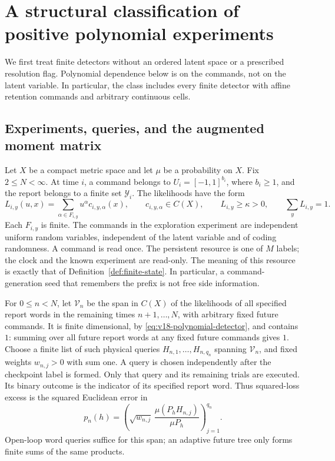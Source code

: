 \documentclass[11pt]{amsart}
\theoremstyle{definition}\newtheorem{definition}[theorem]{Definition}
\theoremstyle{remark}\newtheorem{remark}[theorem]{Remark}
\begin{document}
\section{A structural classification of positive polynomial experiments}
\label{sec:v18-structure}
We first treat finite detectors without an ordered latent space or a
prescribed resolution flag. Polynomial dependence below is on the commands,
not on the latent variable. In particular, the class includes every finite
detector with affine retention commands and arbitrary continuous cells.

\subsection{Experiments, queries, and the augmented moment matrix}
Let $X$ be a compact metric space and let $\mu$ be a probability on $X$.
Fix $2\le N<\infty$. At time $i$, a command belongs to
$U_i=[-1,1]^{b_i}$, where $b_i\ge1$, and the report belongs to a finite set $\mathcal Y_i$.
The likelihoods have the form
\begin{equation}\label{eq:v18-polynomial-detector}
 L_{i,y}(u,x)=\sum_{\alpha\in F_{i,y}}u^\alpha c_{i,y,\alpha}(x),
 \qquad c_{i,y,\alpha}\in C(X),\qquad
 L_{i,y}\ge\kappa>0,\qquad \sum_yL_{i,y}=1.
\end{equation}
Each $F_{i,y}$ is finite. The commands in the exploration experiment are
independent uniform random variables, independent of the latent variable
and of coding randomness. A command is read once. The persistent resource
is one of $M$ labels; the clock and the known experiment are read-only.
The meaning of this resource is exactly that of
Definition~\ref{def:finite-state}. In particular, a command-generation
seed that remembers the prefix is not free side information.

For $0\le n<N$, let $\mathscr V_n$ be the span in $C(X)$ of the
likelihoods of all specified report words in the remaining times
$n+1,\ldots,N$, with arbitrary fixed future commands. It is finite
dimensional, by \eqref{eq:v18-polynomial-detector}, and contains $1$:
summing over all future report words at any fixed future commands gives
$1$. Choose a finite list of such physical queries
$H_{n,1},\ldots,H_{n,q_n}$ spanning $\mathscr V_n$, and fixed weights
$w_{n,j}>0$ with sum one. A query is chosen independently after the
checkpoint label is formed. Only that query and its remaining trials
are executed. Its binary outcome is the indicator of its specified
report word. Thus squared-loss excess is the squared Euclidean error in
\[
 p_n(h)=\left(\sqrt{w_{n,j}}\,
             \frac{\mu(P_hH_{n,j})}{\mu P_h}\right)_{j=1}^{q_n}.
\]
Open-loop word queries suffice for this span; an adaptive future tree
only forms finite sums of the same products.
\end{document}
